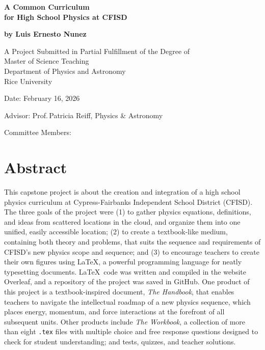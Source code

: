 \documentclass[12pt]{article}
\begin{document}

\begin{titlepage}
    \begin{center}
        \vspace*{1cm}
        {\Huge\bfseries A Common Curriculum\\for High School Physics at CFISD\par}
        \vspace{1cm}
        {\Large \bfseries by Luis Ernesto Nunez\par}
    \end{center}
    \vspace{1cm}
    {\large A Project Submitted in Partial Fulfillment of the Degree of\\Master of Science Teaching\\
    Department of Physics and Astronomy\\
    Rice University}
    
    \vspace{1cm}
    
    {\large \noindent Date: February 16, 2026
    
    \vspace{1cm}
    
    \noindent Advisor: Prof.\,Patricia Reiff, Physics \& Astronomy
    
    \vspace{1cm}
    \noindent Committee Members:
    }
\end{titlepage}


\section*{Abstract}
This capstone project is about the creation and integration of a high school physics curriculum at Cypress-Fairbanks Independent School District (CFISD). The three goals of the project were (1) to gather physics equations, definitions, and ideas from scattered locations in the cloud, and organize them into one unified, easily accessible location; (2) to create a textbook-like medium, containing both theory and problems, that suits the sequence and requirements of CFISD's new physics scope and sequence; and (3) to encourage teachers to create their own figures using \LaTeX, a powerful programming language for neatly typesetting documents. \LaTeX\ code was written and compiled in the website Overleaf, and a repository of the project was saved in GitHub. One product of this project is a textbook-inspired document, \textit{The Handbook}, that enables teachers to navigate the intellectual roadmap of a new physics sequence, which places energy, momentum, and force interactions at the forefront of all subsequent units. Other products include \textit{The Workbook}, a collection of more than eight \texttt{.tex} files with multiple choice and free response questions designed to check for student understanding; and tests, quizzes, and teacher solutions. 
\end{document}

